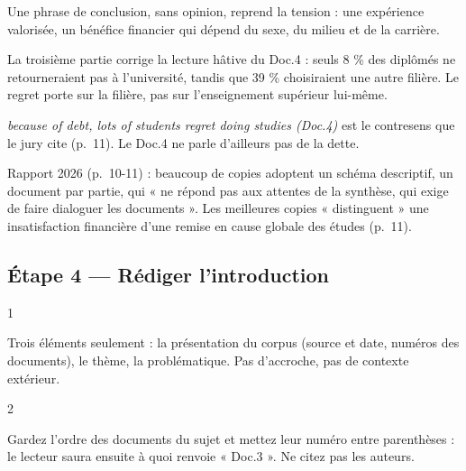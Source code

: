 \documentclass[11pt,a4paper]{article}
\begin{document}
Une phrase de conclusion, sans opinion, reprend la tension : une expérience valorisée, un bénéfice financier qui dépend du sexe, du milieu et de la carrière.

\begin{methode}

La troisième partie corrige la lecture hâtive du Doc.4 : seuls 8 \% des diplômés ne retourneraient pas à l'université, tandis que 39 \% choisiraient une autre filière. Le regret porte sur la filière, pas sur l'enseignement supérieur lui-même.

\end{methode}

\begin{piege}

\emph{because of debt, lots of students regret doing studies (Doc.4)} est le contresens que le jury cite (p.~11). Le Doc.4 ne parle d'ailleurs pas de la dette.

\end{piege}

\begin{jury}

Rapport 2026 (p.~10-11) : beaucoup de copies adoptent un schéma descriptif, un document par partie, qui « ne répond pas aux attentes de la synthèse, qui exige de faire dialoguer les documents ». Les meilleures copies « distinguent » une insatisfaction financière d'une remise en cause globale des études (p.~11).

\end{jury}

\hypertarget{uxe9tape-4-ruxe9diger-lintroduction}{%
\subsection{Étape 4 --- Rédiger l'introduction}\label{uxe9tape-4-ruxe9diger-lintroduction}}

\begin{indication}{1}

Trois éléments seulement : la présentation du corpus (source et date, numéros des documents), le thème, la problématique. Pas d'accroche, pas de contexte extérieur.

\end{indication}

\begin{indication}{2}

Gardez l'ordre des documents du sujet et mettez leur numéro entre parenthèses : le lecteur saura ensuite à quoi renvoie « Doc.3 ». Ne citez pas les auteurs.

\end{indication}
\end{document}
